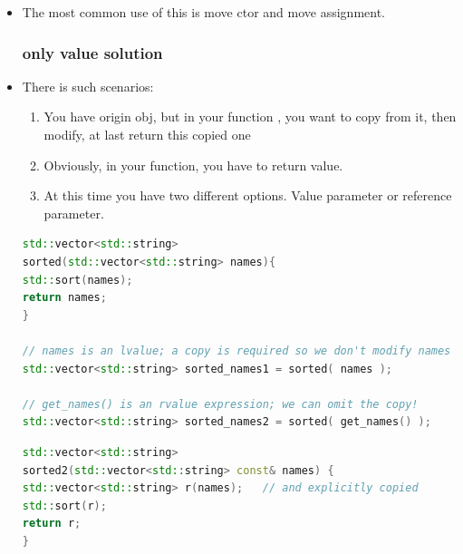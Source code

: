 \documentclass[a4paper,12pt,twoside]{book}
\begin{document}
\begin{itemize}
\item The most common use of this is move ctor and move assignment. 


\subsubsection{only value solution}

\item There is such scenarios:
\begin{enumerate}
	\item You have origin obj, but in your function , you want to copy from it, then modify, at last return this copied one
	\item Obviously, in your function, you have to return value.
	\item At this time you have two different options. Value parameter or reference parameter.
\end{enumerate}

\begin{lstlisting}[frame=single, language=c++]
std::vector<std::string> 
sorted(std::vector<std::string> names){
std::sort(names);
return names;
}

// names is an lvalue; a copy is required so we don't modify names
std::vector<std::string> sorted_names1 = sorted( names );

// get_names() is an rvalue expression; we can omit the copy!
std::vector<std::string> sorted_names2 = sorted( get_names() );
\end{lstlisting}

\begin{lstlisting}[frame=single, language=c++]
std::vector<std::string> 
sorted2(std::vector<std::string> const& names) {
std::vector<std::string> r(names);   // and explicitly copied
std::sort(r);
return r;
}
\end{lstlisting}


\end{itemize}
\end{document}
